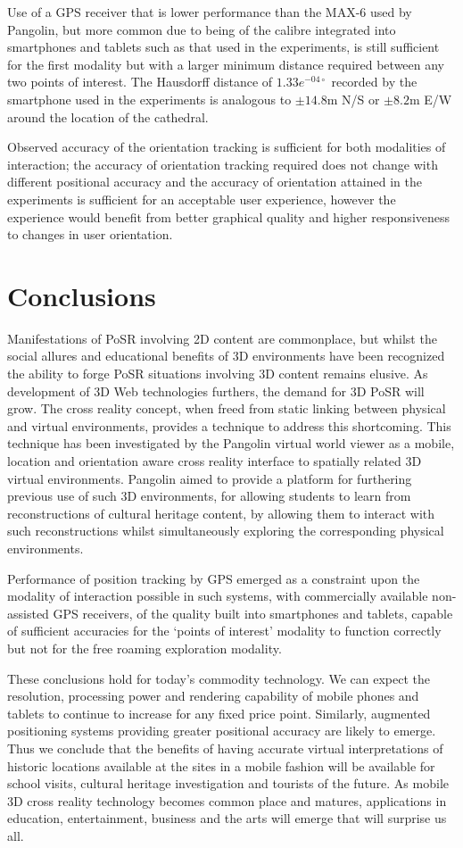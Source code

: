 Use of a GPS receiver that is lower performance than the MAX-6 used by Pangolin, but more common due to being of the calibre integrated into smartphones and tablets such as that used in the experiments, is still sufficient for the first modality but with a larger minimum distance required between any two points of interest. The Hausdorff distance of $1.33e^{-04\circ}$ recorded by the smartphone used in the experiments is analogous to $\pm14.8$m N/S or $\pm8.2$m E/W around the location of the cathedral.

Observed accuracy of the orientation tracking is sufficient for both modalities of interaction; the accuracy of orientation tracking required does not change with different positional accuracy and the accuracy of orientation attained in the experiments is sufficient for an acceptable user experience, however the experience would benefit from better graphical quality and higher responsiveness to changes in user orientation.

\section{Conclusions}
Manifestations of PoSR involving 2D content are commonplace, but whilst the social allures and educational benefits of 3D environments have been recognized the ability to forge PoSR situations involving 3D content remains elusive. As development of 3D Web technologies furthers, the demand for 3D PoSR will grow. The cross reality concept, when freed from static linking between physical and virtual environments, provides a technique to address this shortcoming. This technique has been investigated by the Pangolin virtual world viewer as a mobile, location and orientation aware cross reality interface to spatially related 3D virtual environments. Pangolin aimed to provide a platform for furthering previous use of such 3D environments, for allowing students to learn from reconstructions of cultural heritage content, by allowing them to interact with such reconstructions whilst simultaneously exploring the corresponding physical environments.

Performance of position tracking by GPS emerged as a constraint upon the modality of interaction possible in such systems, with commercially available non-assisted GPS receivers, of the quality built into smartphones and tablets, capable of sufficient accuracies for the `points of interest' modality to function correctly but not for the free roaming exploration modality.

These conclusions hold for today's commodity technology. We can expect the resolution, processing power and rendering capability of mobile phones and tablets to continue to increase for any fixed price point. Similarly, augmented positioning systems providing greater positional accuracy are likely to emerge. Thus we conclude that the benefits of having accurate virtual interpretations of historic locations available at the sites in a mobile fashion will be available for school visits, cultural heritage investigation and tourists of the future. As mobile 3D cross reality technology becomes common place and matures, applications in education, entertainment, business and the arts will emerge that will surprise us all.